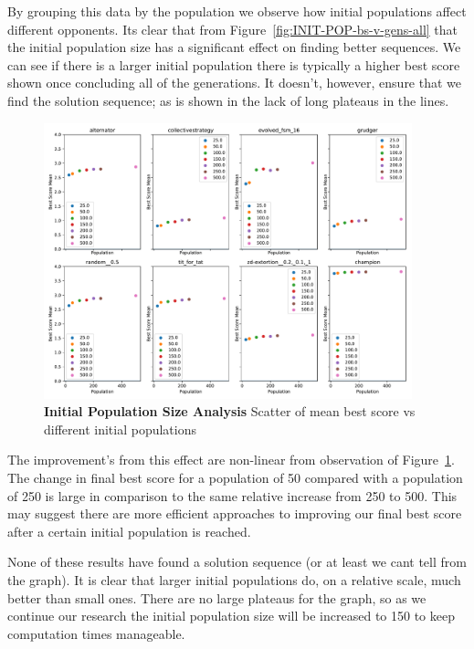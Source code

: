 By grouping this data by the population we observe how initial populations affect different opponents.
Its clear that from Figure~\ref{fig:INIT-POP-bs-v-gens-all} that the initial population size has a significant effect on finding better sequences.
We can see if there is a larger initial population there is typically a higher best score shown once concluding all of the generations.
It doesn't, however, ensure that we find the solution sequence;
as is shown in the lack of long plateaus in the lines.

\begin{figure}[ht]
    \includegraphics[width=0.95\textwidth, keepaspectratio, center]{./img/plots/INIT_POP_mean_bs_diff_v_init_pop_all.pdf}
    \caption{\textbf{Initial Population Size Analysis} Scatter of mean best score vs different initial populations}\label{fig:INIT-POP-mean-bs-v-init-pop-all}
\end{figure}

The improvement's from this effect are non-linear from observation of Figure~\ref{fig:INIT-POP-mean-bs-v-init-pop-all}.
The change in final best score for a population of 50 compared with a population of 250 is large in comparison to the same relative increase from 250 to 500.
This may suggest there are more efficient approaches to improving our final best score after a certain initial population is reached.

None of these results have found a solution sequence (or at least we cant tell from the graph).
It is clear that larger initial populations do, on a relative scale, much better than small ones.
There are no large plateaus for the graph, so as we continue our research the initial population size will be increased to 150 to keep computation times manageable.

